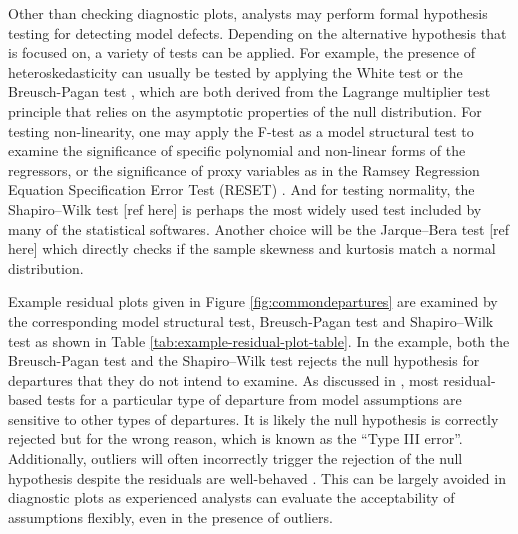 \documentclass[]{interact}
\theoremstyle{plain}%
\theoremstyle{definition}
\theoremstyle{remark}
\begin{document}
Other than checking diagnostic plots, analysts may perform formal
hypothesis testing for detecting model defects. Depending on the
alternative hypothesis that is focused on, a variety of tests can be
applied. For example, the presence of heteroskedasticity can usually be
tested by applying the White test
\citep{white_heteroskedasticity-consistent_1980} or the Breusch-Pagan
test \citep{breusch_simple_1979}, which are both derived from the
Lagrange multiplier test \citep{silvey1959lagrangian} principle that
relies on the asymptotic properties of the null distribution. For
testing non-linearity, one may apply the F-test as a model structural
test to examine the significance of specific polynomial and non-linear
forms of the regressors, or the significance of proxy variables as in
the Ramsey Regression Equation Specification Error Test (RESET)
\citep{ramsey_tests_1969}. And for testing normality, the Shapiro--Wilk
test {[}ref here{]} is perhaps the most widely used test included by
many of the statistical softwares. Another choice will be the
Jarque--Bera test {[}ref here{]} which directly checks if the sample
skewness and kurtosis match a normal distribution.

Example residual plots given in Figure \ref{fig:commondepartures} are
examined by the corresponding model structural test, Breusch-Pagan test
and Shapiro--Wilk test as shown in Table
\ref{tab:example-residual-plot-table}. In the example, both the
Breusch-Pagan test and the Shapiro--Wilk test rejects the null
hypothesis for departures that they do not intend to examine. As
discussed in \citet{cook1982residuals}, most residual-based tests for a
particular type of departure from model assumptions are sensitive to
other types of departures. It is likely the null hypothesis is correctly
rejected but for the wrong reason, which is known as the ``Type III
error''. Additionally, outliers will often incorrectly trigger the
rejection of the null hypothesis despite the residuals are well-behaved
\citep{cook_applied_1999}. This can be largely avoided in diagnostic
plots as experienced analysts can evaluate the acceptability of
assumptions flexibly, even in the presence of outliers.
\end{document}
